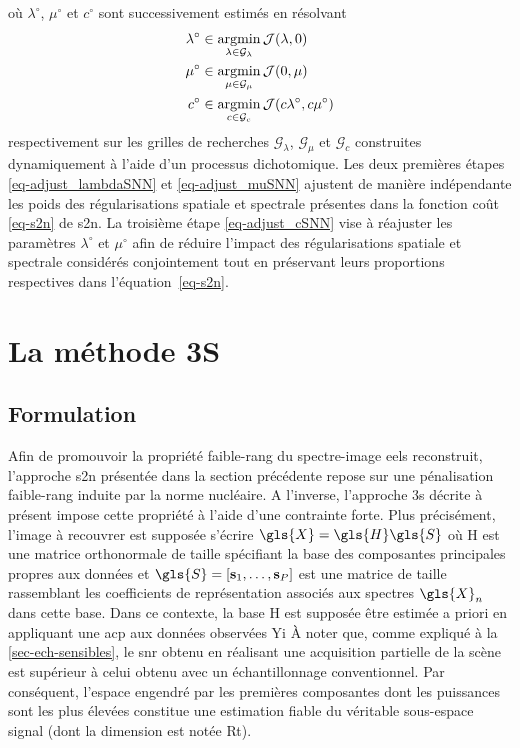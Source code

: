 où $\lambda^{\circ}$, $\mu^{\circ}$ et $c^{\circ}$ sont successivement estimés en résolvant
\begin{align}
\lambda^{\circ} &\in \argmin_{\lambda\in\mathcal{G}_{\lambda}} \mathcal{J}(\lambda,0) \label{eq-adjust_lambdaSNN}\\
%
\mu^{\circ} &\in \argmin_{\mu\in\mathcal{G}_{\mu}} \mathcal{J}(0,\mu) \label{eq-adjust_muSNN}\\
%
c^\circ &\in \argmin_{c\in\mathcal{G}_c} \mathcal{J}(c\lambda^{\circ},c\mu^{\circ})\label{eq-adjust_cSNN}
\end{align} 
respectivement sur les grilles de recherches $\mathcal{G}_{\lambda}$, $\mathcal{G}_{\mu}$ et $\mathcal{G}_{c}$ construites dynamiquement à l'aide d'un processus dichotomique. 
Les deux premières étapes \eqref{eq-adjust_lambdaSNN} et \eqref{eq-adjust_muSNN} ajustent de manière indépendante les poids des régularisations spatiale et spectrale présentes dans la fonction coût \eqref{eq-s2n} de \gls{s2n}.
La troisième étape \eqref{eq-adjust_cSNN} vise à réajuster les paramètres $\lambda^{\circ}$ et $\mu^{\circ}$ afin de réduire l'impact des régularisations spatiale et spectrale considérés conjointement tout en préservant leurs proportions respectives dans l'équation~\eqref{eq-s2n}.

%
\section{La méthode 3S}

\subsection{Formulation}\label{subsec-formulation-3s}

Afin de promouvoir la propriété faible-rang du spectre-image \gls{eels} reconstruit, l'approche \gls{s2n} présentée dans la section précédente repose sur une pénalisation faible-rang induite par la norme nucléaire. A l'inverse, l'approche \gls{3s} décrite à présent impose cette propriété à l'aide d'une contrainte forte.
Plus précisément, l'image à recouvrer est supposée s'écrire $\gls{X} = \gls{H}\gls{S}$ où \gls{H} est une matrice orthonormale de taille  spécifiant la base des composantes principales propres aux données et $\gls{S}=[\mathbf{s}_1, \dots, \mathbf{s}_P]$ est une matrice de taille  rassemblant les coefficients de représentation associés aux spectres $\gls{X}_n$ dans cette base.
Dans ce contexte, la base \gls{H} est supposée être estimée a priori en appliquant une \gls{acp} aux données observées \gls{Yi}%
%
\`A noter que, comme expliqué à la \cref{sec-ech-sensibles}, le \gls{snr} obtenu en réalisant une acquisition partielle de la scène est supérieur à celui obtenu avec un échantillonnage conventionnel. Par conséquent, l'espace engendré par les premières composantes dont les puissances sont les plus élevées constitue une estimation fiable du véritable sous-espace signal (dont la dimension est notée \gls{Rt}).

